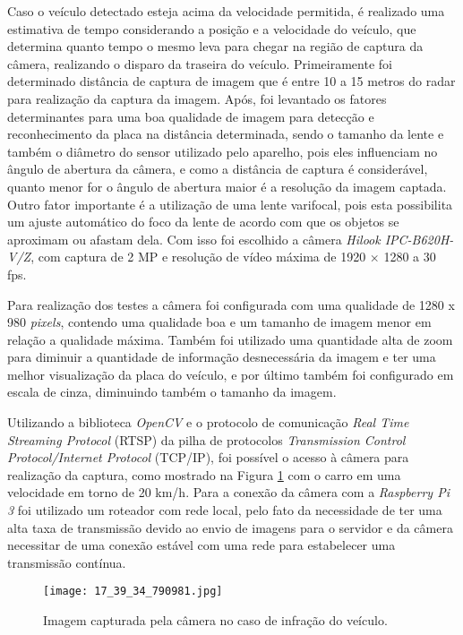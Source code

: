 Caso o veículo detectado esteja acima da velocidade permitida, é realizado uma estimativa de tempo considerando a posição e a velocidade do veículo, que determina quanto tempo o mesmo leva para chegar na região de captura da câmera, realizando o disparo da traseira do veículo.
Primeiramente foi determinado distância de captura de imagem que é entre 10 a 15 metros do radar para realização da captura da imagem. Após, foi levantado os fatores determinantes para uma boa qualidade de imagem para detecção e reconhecimento da placa na distância determinada, sendo o tamanho da lente e também o diâmetro do sensor utilizado pelo aparelho, pois eles influenciam no ângulo de abertura da câmera, e como a distância de captura é considerável, quanto menor for o ângulo de abertura maior é a resolução da imagem captada. Outro fator importante é a utilização de uma lente varifocal, pois esta possibilita um ajuste automático do foco da lente de acordo com que os objetos se aproximam ou afastam dela. Com isso foi escolhido a câmera \emph{Hilook IPC-B620H-V/Z}, com captura de 2 MP e resolução de vídeo máxima de 1920 $\times$ 1280 a 30 fps. \par 
Para realização dos testes a câmera foi configurada com uma qualidade de 1280 x 980 \emph{pixels}, contendo uma qualidade boa e um tamanho de imagem menor em relação a qualidade máxima. Também foi utilizado uma quantidade alta de zoom para diminuir a quantidade de informação desnecessária da imagem e ter uma melhor visualização da placa do veículo, e por último também foi configurado em escala de cinza, diminuindo também o tamanho da imagem. 
\par
Utilizando a biblioteca \emph{OpenCV} e o protocolo de comunicação  \emph{Real Time Streaming Protocol} (RTSP) da pilha de protocolos \emph{Transmission Control Protocol/Internet Protocol} (TCP/IP), foi possível o acesso à câmera para realização da captura, como mostrado na Figura \ref{carro1} com o carro em uma velocidade em torno de 20 km/h. Para a conexão da câmera com a \emph{Raspberry Pi 3} foi utilizado um roteador com rede local, pelo fato da necessidade de ter uma alta taxa de transmissão devido ao envio de imagens para o servidor e da câmera necessitar de uma conexão estável com uma rede para estabelecer uma transmissão contínua. 


\begin{figure}[H]
    \centering
    \texttt{[image: 17\_39\_34\_790981.jpg]}
    \caption{Imagem capturada pela câmera no caso de infração do veículo.}
    \label{carro1}
\end{figure}

